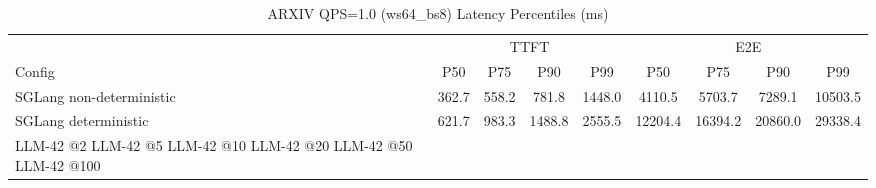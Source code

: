 \begin{table}[htbp]
\centering
\caption{ARXIV QPS=1.0 (ws64_bs8) Latency Percentiles (ms)}
\label{tab:arxiv_qps1.0_ws64_bs8}
\begin{tabular}{l|cccc|cccc}
\toprule
& \multicolumn{4}{c|}{TTFT} & \multicolumn{4}{c}{E2E} \\
Config & P50 & P75 & P90 & P99 & P50 & P75 & P90 & P99 \\
\midrule
SGLang non-deterministic & 362.7 & 558.2 & 781.8 & 1448.0 & 4110.5 & 5703.7 & 7289.1 & 10503.5 \\
SGLang deterministic & 621.7 & 983.3 & 1488.8 & 2555.5 & 12204.4 & 16394.2 & 20860.0 & 29338.4 \\
LLM-42 @2%
LLM-42 @5%
LLM-42 @10%
LLM-42 @20%
LLM-42 @50%
LLM-42 @100%
\bottomrule
\end{tabular}
\end{table}
